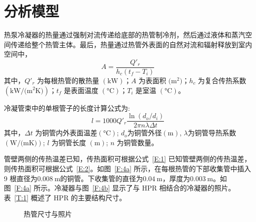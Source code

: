 \section{分析模型}
热泵冷凝器的热量通过强制对流传递给底部的热管制冷剂，然后通过液体和蒸汽空间传递给整个热管主体。最后，热量通过热管外表面的自然对流和辐射释放到室内空间中，
\begin{equation}\label{E:1}
	A = \frac{Q'_{r}}{h_c (t_f - T_i)} 
\end{equation}
其中，$Q'_r$ 为每根热管的散热量 $(\unit{\kW})$；$A$ 为表面积 $(\unit{\m^2)}$；$h_c$ 为复合传热系数 $(\unit{\kW/(\m^2\K)} )$；$t_f$ 是表面温度 $(\unit{\degreeCelsius})$；$T_i$ 是室温 $(\unit{\degreeCelsius})$。

冷凝管束中的单根管子的长度计算公式为:
\begin{equation}\label{E:2}
	l = 1000 Q'_r \frac{\ln (d_o/d_i)}{2 \pi n \lambda \Delta t} 
\end{equation}
其中，$\Delta t$ 为铜管内外表面温差$(\unit{\degreeCelsius})$; $d_o$为铜管外径$(\unit{\m})$, $\lambda$为铜管导热系数 $(\unit{\W/(\m\K)})$; $l$ 为铜管长度 $(\unit{\m})$; $n$ 为铜管数量。

管壁两侧的传热温差已知，传热面积可根据公式~\ref{E:1} 已知管壁两侧的传热温差，则传热面积可根据公式~\ref{E:2}。如图~\ref{F:4a} 所示，在每根热管的下部收集管中插入 9 根直径为$\qty{0.008}{\m} $的铜管。下收集管的直径为$\qty{0.04}{\m} $，厚度为$\qty{0.003}{\m}$。如图~\ref{F:4a} 所示。冷凝器与图~\ref{F:4b} 显示了与 HPR 相结合的冷凝器的照片。表~\ref{T:1} 概述了 HPR 的主要结构尺寸。

\begin{figure}[h]
\centering  %
\caption{热管尺寸与照片}
\label{F:3}
\end{figure}

